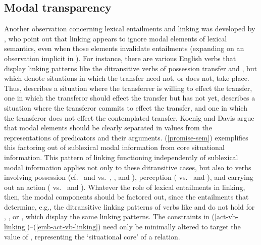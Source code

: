 \documentclass[output=paper
                ,modfonts
                ,nonflat
	        ,collection
	        ,collectionchapter
	        ,collectiontoclongg
 	        ,biblatex
                ,babelshorthands
                ,newtxmath
                ,draftmode
                ,colorlinks, citecolor=brown
]{./langsci/langscibook}
\begin{document}
\subsection{Modal transparency}
Another observation concerning lexical entailments  and linking was developed by \citet{KoenigandDavis2001}, who point out that linking appears to ignore modal elements of lexical semantics, even when those elements invalidate entailments (expanding on an observation implicit in \citealt{Goldberg1995}).
For instance, there are various English verbs that display linking patterns like the ditransitive  verbs of possession transfer  and , but which denote situations in which the transfer need not, or does not, take place.
Thus,  describes a situation where the transferrer is willing to effect the transfer,  one in which the transferor should effect the transfer but has not yet,  describes a situation where the transferor commits to effect the transfer, and  one in which the transferor does not effect the contemplated transfer. 
Koenig and Davis argue that modal elements should be clearly separated in \content values from the representations of predicators and their arguments.  (\ref{promise-sem}) exemplifies this factoring out of sublexical modal information from core situational information. This pattern of linking functioning independently of sublexical modal information applies not only to these ditransitive cases, but also to verbs involving possession (cf.\  and  vs.\ , , and ), perception ( vs.\  and ), and carrying out an action ( vs.\  and ).  Whatever the role of lexical entailments in linking, then, the modal components should be factored out, since the entailments that determine, e.g., the ditransitive linking patterns of verbs like  and  do not hold for , , or , which display the same linking patterns. The constraints in (\ref{act-vb-linking})--(\ref{emb-act-vb-linking}) need only be minimally altered to target the value of , representing the `situational core' of a relation.
\end{document}
